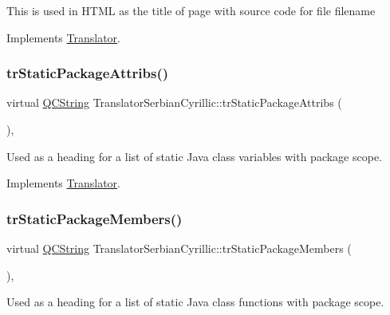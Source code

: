 This is used in H\+T\+ML as the title of page with source code for file filename 

Implements \mbox{\hyperlink{class_translator}{Translator}}.

\mbox{\label{class_translator_serbian_cyrillic_aa0597bcc92c385ff7857e5098c0fb5d4}} 
\subsubsection{\texorpdfstring{trStaticPackageAttribs()}{trStaticPackageAttribs()}}
{\footnotesize\ttfamily virtual \mbox{\hyperlink{class_q_c_string}{Q\+C\+String}} Translator\+Serbian\+Cyrillic\+::tr\+Static\+Package\+Attribs (\begin{DoxyParamCaption}{ }\end{DoxyParamCaption})\hspace{0.3cm}{\ttfamily [inline]}, {\ttfamily [virtual]}}

Used as a heading for a list of static Java class variables with package scope. 

Implements \mbox{\hyperlink{class_translator}{Translator}}.

\mbox{\label{class_translator_serbian_cyrillic_acb67cc91c86ad043ab16647054580c4e}} 
\subsubsection{\texorpdfstring{trStaticPackageMembers()}{trStaticPackageMembers()}}
{\footnotesize\ttfamily virtual \mbox{\hyperlink{class_q_c_string}{Q\+C\+String}} Translator\+Serbian\+Cyrillic\+::tr\+Static\+Package\+Members (\begin{DoxyParamCaption}{ }\end{DoxyParamCaption})\hspace{0.3cm}{\ttfamily [inline]}, {\ttfamily [virtual]}}

Used as a heading for a list of static Java class functions with package scope. 

